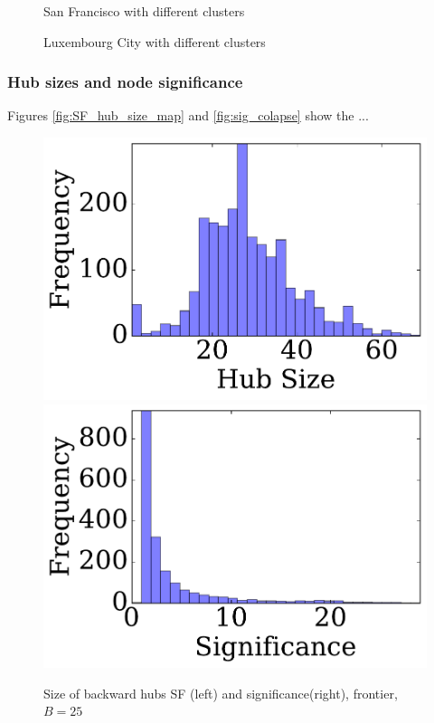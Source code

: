 \begin{figure}
\hfill

\caption{San Francisco with different clusters}\label{fig:clusters_sf}
\end{figure}

\begin{figure}
\hfill

\caption{Luxembourg City with different clusters}\label{fig:clusters_lu}
\end{figure}


\subsubsection{Hub sizes and node significance}

Figures \ref{fig:SF_hub_size_map} and \ref{fig:sig_colapse} show the ...

\begin{figure} 
\begin{center}
\includegraphics[clip, trim = 0.1cm 0.3cm 0cm 0cm,scale=0.27]{TexImg/SF_bwd_hub_size.pdf}
\includegraphics[clip, trim = 1.3cm 0.3cm 0cm 0cm,scale=0.27]{TexImg/significance.pdf}
\end{center}
\caption{Size of backward hubs SF (left) and significance(right), frontier, $B=25$}\label{fig:SF_bwd_size}
\end{figure}


